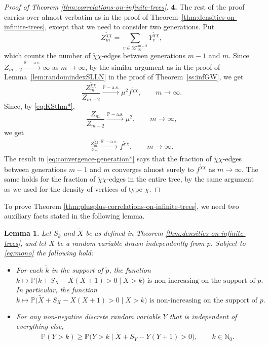 \documentclass[11pt]{article}
\numberwithin{equation}{section}
\theoremstyle{plain}
\newtheorem{lemma}[theorem]{Lemma}
\newcommand{\N}{\mathbb N}
\newcommand{\PP}{\mathbb{P}}
\newcommand{\Tt}{\mathcal{T}}
\newcommand{\tX}{\tilde{X}}
\newcommand{\tk}{\tilde{k}}
\newcommand{\tchi}{{\tilde{\chi}}}
\begin{document}
\begin{proof}[Proof of Theorem \ref{thm:correlations-on-infinite-trees}]
\medskip\noindent
{\bf 4.}
The rest of the proof carries over almost verbatim as in the proof of Theorem~\ref{thm:densities-on-infinite-trees}, except that we need to consider two generations. Put
\[
Z_m^{\tchi\chi} = \sum_{v \in \partial \Tt^{m-2}_\infty} Y_v^{\tchi\chi}, 
\]
which counts the number of $\tchi\chi$-edges between generations $m-1$ and $m$. Since $Z_{m-2} \stackrel{\PP-\mathrm{a.s.}}{\longrightarrow} \infty$ as $m\to\infty$, by the similar argument as in the proof of Lemma~\ref{lem:randomindexSLLN} in the proof of Theorem~\ref{ss:infGW}, we get
\[
\frac{Z_m^{\tchi\chi}}{Z_{m-2}} \stackrel{\PP-\mathrm{a.s.}}{\longrightarrow} 
\mu^2 f^{\tchi\chi}, \qquad m\to \infty.
\]
Since, by \eqref{eq:KSthm*},
\[
\frac{Z_m}{Z_{m-2}} \stackrel{\PP-\mathrm{a.s.}}{\longrightarrow} \mu^2, \qquad m \to \infty,
\]
we get
\begin{align}
\label{eq:convergence-generation*}
\frac{Z_m^{\tchi\chi}}{Z_m} \stackrel{\PP-\mathrm{a.s.}}{\longrightarrow} f^{\tchi\chi}, \qquad m\to \infty.
\end{align}
The result in \eqref{eq:convergence-generation*} says that the fraction of $\tchi\chi$-edges between generations $m-1$ and $m$ converges almost surely to $f^{\tchi\chi}$ as $m\to\infty$. 
The same holds for the fraction of $\tchi\chi$-edges in the entire tree, by the same argument as we used for the density of vertices of type $\chi$. 
\end{proof}

To prove Theorem \ref{thm:plusplus-correlations-on-infinite-trees}, we need two auxiliary facts stated in the following lemma.
\begin{lemma} 
\label{l:aux}
Let $S_k$ and $\tilde{X}$ be as defined in Theorem \ref{thm:densities-on-infinite-trees}, and let $X$ be a random variable drawn independently from $p$. Subject to \eqref{eq:mono} the following hold:
\begin{itemize}
\item[(a)] 
For each $\tk$ in the support of $\tilde{p}$, the function 
\begin{equation}
\label{eq:mono>ap}
k \mapsto \PP\big(\tk + S_X - X(X+1) > 0 \mid X > k\big) \text{ is non-increasing on the support of } p.
\end{equation}
In particular, the function 
\begin{equation}
\label{eq:mono>}
k \mapsto \PP\big(\tX + S_X - X(X+1) > 0 \mid X > k\big) \text{ is non-increasing on the support of } p.
\end{equation}
\item[(b)] 
For any non-negative discrete random variable $Y$ that is independent of everything else, 
\begin{equation}
\label{eq:mono-st}
\PP(Y > k) \geq \PP\big(Y > k \mid \tX + S_Y - Y(Y+1) > 0\big),  \qquad k \in \N_0.
\end{equation}
\end{itemize}
\end{lemma}
\end{document}
